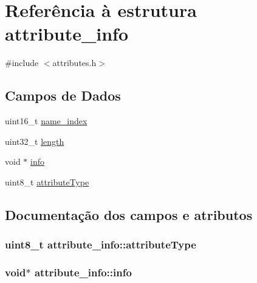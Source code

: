 \hypertarget{structattribute__info}{}\section{Referência à estrutura attribute\+\_\+info}
\label{structattribute__info}


{\ttfamily \#include $<$attributes.\+h$>$}

\subsection*{Campos de Dados}
\begin{DoxyCompactItemize}
\item 
uint16\+\_\+t \hyperlink{structattribute__info_a7e925cf3d7a72731f1b6a6e4d1c24cc2}{name\+\_\+index}
\item 
uint32\+\_\+t \hyperlink{structattribute__info_a9528b298d46309f571f1f58c84cbd57c}{length}
\item 
void $\ast$ \hyperlink{structattribute__info_a7f168925308e418b7b44c9f11fdf42ae}{info}
\item 
uint8\+\_\+t \hyperlink{structattribute__info_aba7285ff2ef220420c41b51470921544}{attribute\+Type}
\end{DoxyCompactItemize}


\subsection{Documentação dos campos e atributos}
\subsubsection[{\texorpdfstring{attribute\+Type}{attributeType}}]{\setlength{\rightskip}{0pt plus 5cm}uint8\+\_\+t attribute\+\_\+info\+::attribute\+Type}\hypertarget{structattribute__info_aba7285ff2ef220420c41b51470921544}{}\label{structattribute__info_aba7285ff2ef220420c41b51470921544}
\subsubsection[{\texorpdfstring{info}{info}}]{\setlength{\rightskip}{0pt plus 5cm}void$\ast$ attribute\+\_\+info\+::info}\hypertarget{structattribute__info_a7f168925308e418b7b44c9f11fdf42ae}{}\label{structattribute__info_a7f168925308e418b7b44c9f11fdf42ae}
